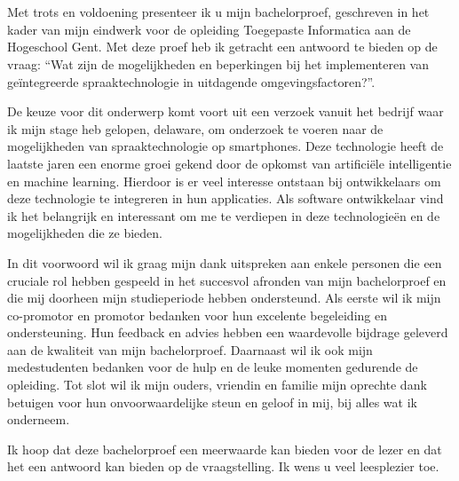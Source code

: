 
\chapter*{}%
\label{ch:voorwoord}


Met trots en voldoening presenteer ik u mijn bachelorproef, geschreven in het kader van mijn eindwerk voor de opleiding Toegepaste Informatica aan de Hogeschool Gent. Met deze proef heb ik getracht een antwoord te bieden op de vraag: ``Wat zijn de mogelijkheden en beperkingen bij het implementeren van geïntegreerde spraaktechnologie in uitdagende omgevingsfactoren?''.
\newline


De keuze voor dit onderwerp komt voort uit een verzoek vanuit het bedrijf waar ik mijn stage heb gelopen, delaware, om onderzoek te voeren naar de mogelijkheden van spraaktechnologie op smartphones. Deze technologie heeft de laatste jaren een enorme groei gekend door de opkomst van artificiële intelligentie en machine learning. Hierdoor is er veel interesse ontstaan bij ontwikkelaars om deze technologie te integreren in hun applicaties. Als software ontwikkelaar vind ik het belangrijk en interessant om me te verdiepen in deze technologieën en de mogelijkheden die ze bieden.
\newline


In dit voorwoord wil ik graag mijn dank uitspreken aan enkele personen die een cruciale rol hebben gespeeld in het succesvol afronden van mijn bachelorproef en die mij doorheen mijn studieperiode hebben ondersteund. Als eerste wil ik mijn co-promotor en promotor bedanken voor hun excelente begeleiding en ondersteuning. Hun feedback en advies hebben een waardevolle bijdrage geleverd aan de kwaliteit van mijn bachelorproef. Daarnaast wil ik ook mijn medestudenten bedanken voor de hulp en de leuke momenten gedurende de opleiding. Tot slot wil ik mijn ouders, vriendin en familie mijn oprechte dank betuigen voor hun onvoorwaardelijke steun en geloof in mij, bij alles wat ik onderneem.
\newline

Ik hoop dat deze bachelorproef een meerwaarde kan bieden voor de lezer en dat het een antwoord kan bieden op de vraagstelling. Ik wens u veel leesplezier toe.

